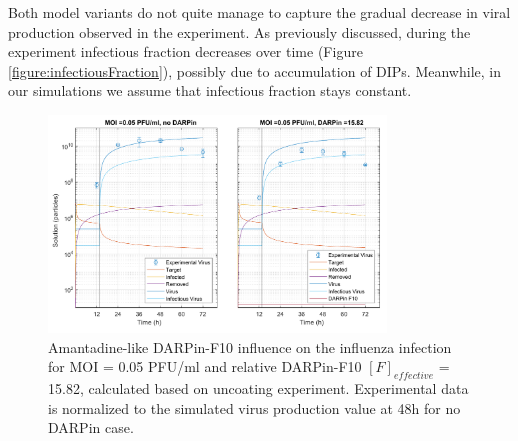 Both model variants do not quite manage to capture the gradual decrease in viral production observed in the experiment. As previously discussed, during the experiment infectious fraction decreases over time (Figure \ref{figure:infectiousFraction}), possibly due to accumulation of DIPs. Meanwhile, in our simulations we assume that infectious fraction stays constant.

\begin{figure}
\begin{center}
\includegraphics[width=0.8\textwidth, trim={0cm 0cm 0cm 0cm}, clip]{D_chapters/3_DARPinModels/2_DARPinInfection/comparisonModelTHillIRVViDelayMOI0.072135DARPin15.816AsymmetricDarpinMyosinInhibitor.pdf}
\caption[Amantadine-like DARPin-F10 for MOI = 0.05 PFU/ml and $F_{effective}$ = 15.82]{Amantadine-like DARPin-F10 influence on the influenza infection for MOI = 0.05 PFU/ml and relative DARPin-F10 $[F]_{effective}$ = 15.82, calculated based on uncoating experiment. Experimental data is normalized to the simulated virus production value at 48h for no DARPin case.}
\label{figure:amantadineLikeF15}
\end{center}
\end{figure}

